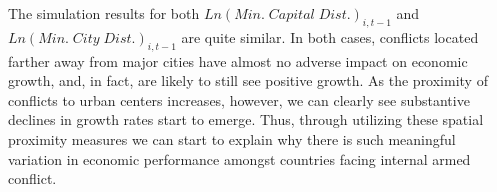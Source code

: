 The simulation results for both $Ln(Min. \; Capital \; Dist.)_{i,t-1}$ and $Ln(Min. \; City \; Dist.)_{i,t-1}$ are quite similar. In both cases, conflicts located farther away from major cities have almost no adverse impact on economic growth, and, in fact, are likely to still see positive growth. As the proximity of conflicts to urban centers increases, however, we can clearly see substantive declines in growth rates start to emerge. Thus, through utilizing these spatial proximity measures we can start to explain why there is such meaningful variation in economic performance amongst countries facing internal armed conflict.